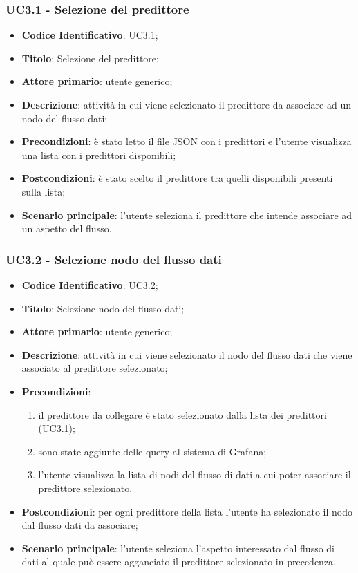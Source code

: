 		\label{par:UC3.1}
		\subsubsection{UC3.1 - Selezione del predittore}
		\begin{itemize}
			\item\textbf{Codice Identificativo}: UC3.1;
			\item\textbf{Titolo}: Selezione del predittore;
			\item\textbf{Attore primario}: utente generico;
			\item\textbf{Descrizione}: attività in cui viene selezionato il predittore da associare ad un nodo del flusso dati;
			\item\textbf{Precondizioni}: è stato letto il file JSON con i predittori e l'utente visualizza una lista con i predittori disponibili;
			\item\textbf{Postcondizioni}: è stato scelto il predittore tra quelli disponibili presenti sulla lista;
			\item\textbf{Scenario principale}: l'utente seleziona il predittore che intende associare ad un aspetto del flusso.
		\end{itemize}
		
	
	\label{par:UC3.2}
	\subsubsection{UC3.2 - Selezione nodo del flusso dati}
		\begin{itemize}
			\item\textbf{Codice Identificativo}: UC3.2;
			\item\textbf{Titolo}: Selezione nodo del flusso dati;
			\item\textbf{Attore primario}: utente generico;
			\item\textbf{Descrizione}: attività in cui viene selezionato il nodo del flusso dati che viene associato al predittore selezionato;
			\item\textbf{Precondizioni}:
				\begin{enumerate}
					\item il predittore da collegare è stato selezionato dalla lista dei predittori (\hyperref[par:UC3.1]{UC3.1});
					\item sono state aggiunte delle query al sistema di Grafana;
					\item l'utente visualizza la lista di nodi del flusso di dati a cui poter associare il predittore selezionato.
				\end{enumerate}
			\item\textbf{Postcondizioni}: per ogni predittore della lista l'utente ha selezionato il nodo dal flusso dati da associare;
		
			\item\textbf{Scenario principale}: l'utente seleziona l'aspetto interessato dal flusso di dati al quale può essere agganciato il predittore selezionato in precedenza.
		\end{itemize}
\label{par:UC3.3}
